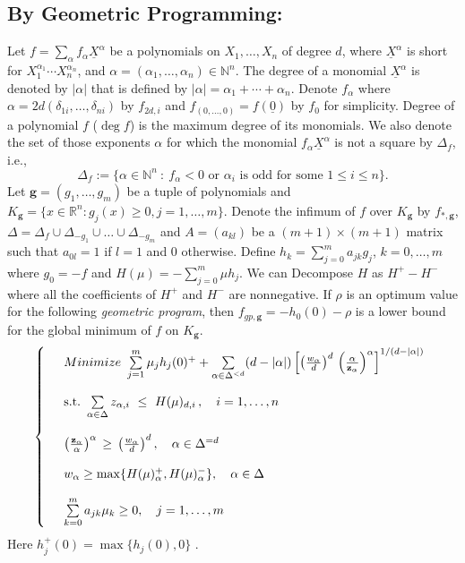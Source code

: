 \documentclass{amsart}
\theoremstyle{definition}
\newcommand{\reals}{\mathbb{R}}
\newcommand{\naturals}{\mathbb{N}}
\newcommand{\ux}{\underline{X}}
\begin{document}
\subsection{By Geometric Programming:}
Let $f=\sum_{\alpha}f_{\alpha}\ux^{\alpha}$ be a polynomials on $X_1,\dots, X_n$ of degree $d$, where $\ux^{\alpha}$ is short for 
$X_1^{\alpha_1}\cdots X_n^{\alpha_n}$, and $\alpha=(\alpha_1,\dots,\alpha_n)\in\naturals^n$. 
The degree of a monomial $\ux^{\alpha}$ is denoted by $|\alpha|$ that is defined by $|\alpha|=\alpha_1+\cdots+\alpha_n$. 
Denote $f_{\alpha}$ where $\alpha=2d(\delta_{1i},\dots,\delta_{ni})$ by $f_{2d,i}$ and $f_{(0,\dots,0)}=f(\underline{0})$ by $f_0$ for simplicity.
Degree of a polynomial $f$ ($\deg f$) is the maximum degree of its monomials.
We also denote the set of those exponents $\alpha$ for which the monomial $f_{\alpha}\ux^{\alpha}$ is not a square by $\Delta_f$, i.e.,
\[
	\Delta_f:=\{\alpha\in\naturals^n ~:~ f_{\alpha}<0\textrm{ or }\alpha_i\textrm{ is odd for some }1\leq i\leq n\}.
\]
Let $\textbf{g}=(g_1,\dots,g_m)$ be a tuple of polynomials and $K_{\textbf{g}}=\{x\in\reals^n : g_j(x)\ge 0, j=1,\dots,m\}$. Denote the infimum 
of $f$ over $K_{\textbf{g}}$ by $f_{*,\textbf{g}}$, $\Delta=\Delta_f\cup\Delta_{-g_1}\cup\dots\cup\Delta_{-g_m}$ and $A=(a_{kl})$ be a 
$(m+1)\times(m+1)$ matrix such that $a_{0l}=1$ if $l=1$ and $0$ otherwise. Define $h_k=\sum_{j=0}^m a_{jk}g_j$, $k=0,\dots,m$ where $g_0=-f$ and
$H(\mu)=-\sum_{j=0}^m \mu h_j$. We can Decompose $H$ as $H^+-H^-$ where all the coefficients of $H^+$ and $H^-$ are nonnegative.
If $\rho$ is an optimum value for the following \textit{geometric program}, then $f_{gp,\textbf{g}}=-h_0(0)-\rho$ is a lower bound for the global 
minimum of $f$ on $K_{\textbf{g}}$.
\begin{equation}\label{GP}
\left\{\begin{array}{rl}
&Minimize \ \sum\limits_{j=1}^m \mu_jh_j(0)^++ \sum\limits_{\alpha\in\Delta^{<d}}(d-\vert\alpha\vert)\left[
\left(\frac{w_\alpha}{d}\right)^{d}\,\left(\frac{\alpha}{\bold{z}_\alpha}\right)^\alpha
\right]^{1/(d-\vert\alpha\vert)}\\
&\\
&\mbox{s.t.}\ \sum\limits_{\alpha\in\Delta}z_{\alpha,i} \ \le \ H(\mu)_{d,i}\,,\quad i=1,\ldots,n\\
&\\
&\left(\frac{\bold{z}_\alpha}{\alpha}\right)^\alpha \,\ge \,\left(\frac{w_\alpha}{d}\right)^{d},\quad\alpha\in\Delta^{=d} \\
&\\
&w_{\alpha}\ge \max\{ H(\mu)_{\alpha}^+, H(\mu)_{\alpha}^-\}, \quad\alpha \in \Delta \\
&\\
&\sum\limits_{k=0}^m a_{jk}\mu_k \ge 0, \quad j=1,\dots,m
\end{array}\right.
\end{equation}
Here $h_j^+(0)=\max\{h_j(0),0\}$ \cite[Theorem 4.1]{genlbgp}.
\end{document}
